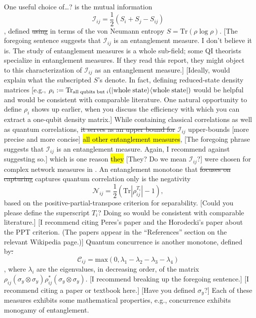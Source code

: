 \documentclass[11pt]{article}
\newcommand{\nicole}[1]{{\color{Green}#1}}
\begin{document}
\begin{multicols}{2}
One useful choice \nicole{of\ldots?} is the mutual information $$\mathcal{I}_{ij} = \frac{1}{2}(S_i + S_j - S_{ij}) $$\nicole{,} defined \sout{using} \nicole{in terms of} the von Neumann entropy $S = \text{Tr}(\rho \log \rho) $. 
\nicole{[The foregoing sentence suggests that $\mathcal{I}_{ij}$ is an entanglement measure. I don't believe it is. The study of entanglement measures is a whole sub-field; some QI theorists specialize in entanglement measures. If they read this report, they might object to this characterization of $\mathcal{I}_{ij}$ as an entanglement measure.]}
\nicole{[Ideally, would explain what the subscripted $S$'s denote. In fact, defining  reduced-state density matrices [e.g., 
$\rho_i := {\rm Tr}_{ {\rm all \; qubits \; but} \; i} 
(| {\rm whole \; state} \rangle \langle {\rm whole \; state} |) $
would be helpful and would be consistent with comparable literature.
One natural opportunity to define $\rho_i$ shows up earlier, when you discuss the efficiency with which you can extract a one-qubit density matrix.]}
While containing classical correlations as well as quantum correlations, \sout{it serves as an upper bound for} 
\nicole{$\mathcal{I}_{ij}$ upper-bounds [more precise and more concise]}
\hl{all other  entanglement measures}, 
\nicole{[The foregoing phrase suggests that $\mathcal{I}_{ij}$ is an entanglement measure. Again, I recommend against suggesting so.]}
which is one reason \hl{they} 
\nicole{[They? Do we mean $\mathcal{I}_{ij}$?]}
were chosen for complex network measures in \cite{Carr}. 
An entanglement monotone that \sout{focuses on capturing} \nicole{captures} quantum correlation only is the negativity $$\mathcal{N}_{ij} = \frac{1}{2}(\text{Tr}|\rho_{ij}^{T_i}|-1),$$ based on the positive-partial-transpose criterion for separability. 
\nicole{[Could you please define the superscript $T_i$? Doing so would be consistent with comparable literature.]}
\nicole{[I recommend citing Peres's paper and the Horodecki's paper about the PPT criterion. (The papers appear in the ``References'' section on the relevant Wikipedia page.)]}
Quantum concurrence is another monotone\nicole{,} defined by\sout{:}
$$\mathcal{C}_{ij} = \text{max}(0,\lambda_1 -\lambda_2 - \lambda_3 - \lambda_4)$$\nicole{,}
where $\lambda_i$ are the eigenvalues\nicole{,} in decreasing order\nicole{,} 
of the matrix $\rho_{ij} (\sigma_y \otimes \sigma_y) \rho_{ij}^* (\sigma_y \otimes \sigma_y) $. 
\nicole{[I recommend breaking up the foregoing sentence.]}
\nicole{[I recommend citing a paper or textbook here.]}
\nicole{[Have you defined $\sigma_y$?]}
Each of these measures exhibit\nicole{s} some mathematical properties, e.g.\nicole{,} concurrence exhibits monogamy of entanglement.

\end{multicols}
\end{document}
